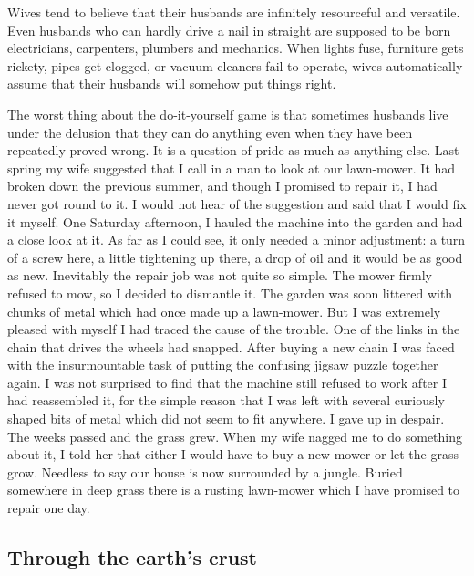 \documentclass[11pt]{article}
\begin{document}
Wives tend to believe that their husbands are infinitely resourceful and versatile. Even husbands who can hardly drive a nail in straight are supposed to be born electricians, carpenters, plumbers and mechanics. When lights fuse, furniture gets rickety, pipes get clogged, or vacuum cleaners fail to operate, wives automatically assume that their husbands will somehow put things right. 

The worst thing about the do-it-yourself game is that sometimes husbands live under the delusion that they can do anything even when they have been repeatedly proved wrong. It is a question of pride as much as anything else. Last spring my wife suggested that I call in a man to look at our lawn-mower. It had broken down the previous summer, and though I promised to repair it, I had never got round to it. I would not hear of the suggestion and said that I would fix it myself. One Saturday afternoon, I hauled the machine into the garden and had a close look at it. As far as I could see, it only needed a minor adjustment: a turn of a screw here, a little tightening up there, a drop of oil and it would be as good as new. Inevitably the repair job was not quite so simple. The mower firmly refused to mow, so I decided to dismantle it. The garden was soon littered with chunks of metal which had once made up a lawn-mower. But I was extremely pleased with myself I had traced the cause of the trouble. One of the links in the chain that drives the wheels had snapped. After buying a new chain I was faced with the insurmountable task of putting the confusing jigsaw puzzle together again. I was not surprised to find that the machine still refused to work after I had reassembled it, for the simple reason that I was left with several curiously shaped bits of metal which did not seem to fit anywhere. I gave up in despair. The weeks passed and the grass grew. When my wife nagged me to do something about it, I told her that either I would have to buy a new mower or let the grass grow. Needless to say our house is now surrounded by a jungle. Buried somewhere in deep grass there is a rusting lawn-mower which I have promised to repair one day.
\subsection{Through the earth's crust}
\label{sec-1-47}
\end{document}

